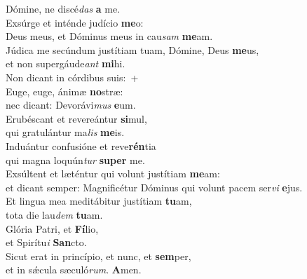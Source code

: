 \oddverse Dómine, ne discé\textit{das} \textbf{a} me.\\
\evenverse Exsúrge et inténde judício \textbf{me}o:~\*\\
\evenverse Deus meus, et Dóminus meus in cau\textit{sam} \textbf{me}am.\\
\oddverse Júdica me secúndum justítiam tuam, Dómine, Deus \textbf{me}us,~\*\\
\oddverse et non supergáude\textit{ant} \textbf{mi}hi.\\
\evenverse Non dicant in córdibus suis:~+\\
\evenverse  Euge, euge, ánimæ \textbf{no}stræ:~\*\\
\evenverse nec dicant: Devorávi\textit{mus} \textbf{e}um.\\
\oddverse Erubéscant et revereántur \textbf{si}mul,~\*\\
\oddverse qui gratulántur ma\textit{lis} \textbf{me}is.\\
\evenverse Induántur confusióne et reve\textbf{rén}tia~\*\\
\evenverse qui magna loquún\textit{tur} \textbf{su}\textbf{per} me.\\
\oddverse Exsúltent et læténtur qui volunt justítiam \textbf{me}am:~\*\\
\oddverse et dicant semper: Magnificétur Dóminus qui volunt pacem ser\textit{vi} \textbf{e}jus.\\
\evenverse Et lingua mea meditábitur justítiam \textbf{tu}am,~\*\\
\evenverse tota die lau\textit{dem} \textbf{tu}am.\\
\oddverse Glória Patri, et \textbf{Fí}lio,~\*\\
\oddverse et Spirítu\textit{i} \textbf{San}cto.\\
\evenverse Sicut erat in princípio, et nunc, et \textbf{sem}per,~\*\\
\evenverse et in sǽcula sæculó\textit{rum}. \textbf{A}men.\\

